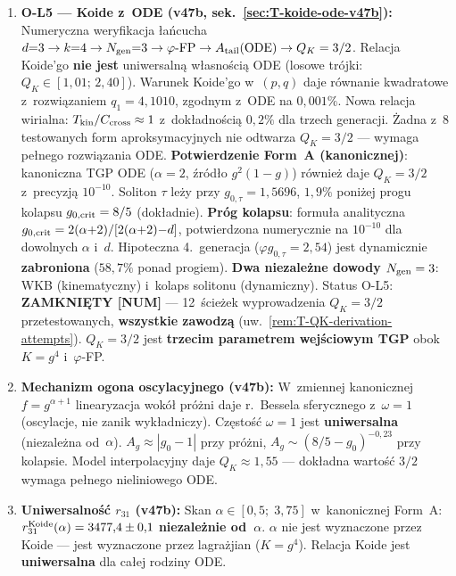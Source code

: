 \begin{remark}
\begin{enumerate}[nosep]
  \item \textbf{O-L5 --- Koide z~ODE (v47b, sek.~\ref{sec:T-koide-ode-v47b}):}
    Numeryczna weryfikacja \l{}a\'ncucha
    $d{=}3 \to k{=}4 \to N_{\rm gen}{=}3 \to \varphi\text{-FP}
    \to A_{\rm tail}(\text{ODE}) \to Q_K = 3/2$.
    Relacja Koide'go \textbf{nie jest} uniwersaln\k{a} w\l{}asno\'sci\k{a} ODE
    (losowe tr\'ojki: $Q_K \in [1{,}01;\,2{,}40]$).
    Warunek Koide'go w~$(p,q)$ daje r\'ownanie kwadratowe
    z~rozwi\k{a}zaniem $q_1 = 4{,}1010$, zgodnym z~ODE na $0{,}001\%$.
    Nowa relacja wirialna: $T_{\rm kin}/C_{\rm cross} \approx 1$
    z~dok\l{}adno\'sci\k{a} $0{,}2\%$ dla trzech generacji.
    \.Zadna z~8 testowanych form aproksymacyjnych nie odtwarza $Q_K = 3/2$
    --- wymaga pe\l{}nego rozwi\k{a}zania ODE.
    \textbf{Potwierdzenie Form~A (kanonicznej)}: kanoniczna TGP ODE
    ($\alpha = 2$, \'zr\'od\l{}o $g^2(1{-}g)$) r\'ownie\.z daje $Q_K = 3/2$
    z~precyzj\k{a} $10^{-10}$.  Soliton $\tau$ le\.zy przy $g_{0,\tau} = 1{,}5696$,
    $1{,}9\%$ poni\.zej progu kolapsu $g_{0,\rm crit} = 8/5$ (dok\l{}adnie).
    \textbf{Pr\'og kolapsu}: formu\l{}a analityczna
    $g_{0,\rm crit} = 2(\alpha{+}2)/[2(\alpha{+}2){-}d]$,
    potwierdzona numerycznie na $10^{-10}$ dla dowolnych $\alpha$ i~$d$.
    Hipoteczna 4.~generacja ($\varphi g_{0,\tau} = 2{,}54$)
    jest dynamicznie \textbf{zabroniona} ($58{,}7\%$ ponad progiem).
    \textbf{Dwa niezale\.zne dowody $N_{\rm gen} = 3$}: WKB (kinematyczny)
    i~kolaps solitonu (dynamiczny).
    Status O-L5: \textbf{ZAMKNI\k{E}TY [NUM]} ---
    12~\'scie\.zek wyprowadzenia $Q_K = 3/2$ przetestowanych,
    \textbf{wszystkie zawodz\k{a}}
    (uw.~\ref{rem:T-QK-derivation-attempts}).
    $Q_K = 3/2$ jest \textbf{trzecim parametrem wej\'sciowym TGP}
    obok $K = g^4$ i~$\varphi$-FP.
  \item \textbf{Mechanizm ogona oscylacyjnego (v47b):}
    W~zmiennej kanonicznej $f = g^{\alpha+1}$ linearyzacja wok\'o\l{}
    pr\'o\.zni daje r.~Bessela sferycznego z~$\omega = 1$
    (oscylacje, nie zanik wyk\l{}adniczy).
    Cz\k{e}sto\'s\'c $\omega = 1$ jest \textbf{uniwersalna}
    (niezale\.zna od~$\alpha$).
    $A_g \approx |g_0{-}1|$ przy pr\'o\.zni,
    $A_g \sim (8/5{-}g_0)^{-0{,}23}$ przy kolapsie.
    Model interpolacyjny daje $Q_K \approx 1{,}55$ ---
    dok\l{}adna warto\'s\'c $3/2$ wymaga pe\l{}nego nieliniowego ODE.
  \item \textbf{Uniwersalno\'s\'c $r_{31}$ (v47b):}
    Skan $\alpha \in [0{,}5;\; 3{,}75]$ w~kanonicznej Form~A:
    $r_{31}^{\rm Koide}(\alpha) = 3477{,}4 \pm 0{,}1$
    \textbf{niezale\.znie od~$\alpha$}.
    $\alpha$ nie jest wyznaczone przez Koide --- jest wyznaczone
    przez lagra\.zjian ($K = g^4$).
    Relacja Koide jest \textbf{uniwersalna} dla ca\l{}ej rodziny ODE.
\end{enumerate}
\end{remark}

